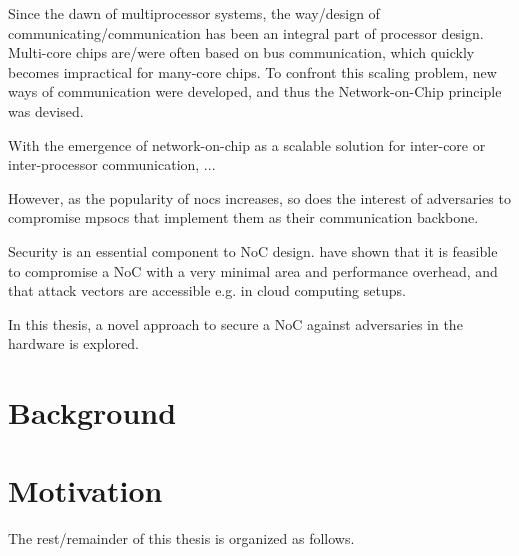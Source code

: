 Since the dawn of multiprocessor systems, the way/design of communicating/communication has been an integral part of processor design.
Multi-core chips are/were often based on bus communication, which quickly becomes impractical for many-core chips.
To confront this scaling problem, new ways of communication were developed, and thus the Network-on-Chip principle was devised.

With the emergence of network-on-chip as a scalable solution for inter-core or inter-processor communication, ...

However, as the popularity of \glspl{noc} increases, so does the interest of adversaries to compromise \glspl{mpsoc} that implement them as their communication
backbone.

Security is an essential component to NoC design. \citeauthor{ancajas14fortnocs} have shown that it is feasible to compromise a NoC with a very
minimal area and performance overhead, and that attack vectors are accessible e.g. in cloud computing setups. \cite{ancajas14fortnocs}

In this thesis, a novel approach to secure a NoC against adversaries in the hardware is explored.

\section{Background}\label{sec:background}

\section{Motivation}\label{sec:motivation}

The rest/remainder of this thesis is organized as follows.
